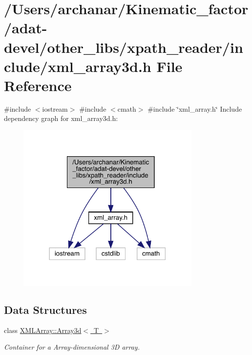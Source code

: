 \hypertarget{adat-devel_2other__libs_2xpath__reader_2include_2xml__array3d_8h}{}\section{/\+Users/archanar/\+Kinematic\+\_\+factor/adat-\/devel/other\+\_\+libs/xpath\+\_\+reader/include/xml\+\_\+array3d.h File Reference}
\label{adat-devel_2other__libs_2xpath__reader_2include_2xml__array3d_8h}
{\ttfamily \#include $<$iostream$>$}\newline
{\ttfamily \#include $<$cmath$>$}\newline
{\ttfamily \#include \char`\"{}xml\+\_\+array.\+h\char`\"{}}\newline
Include dependency graph for xml\+\_\+array3d.\+h\+:
\nopagebreak
\begin{figure}[H]
\begin{center}
\leavevmode
\includegraphics[width=258pt]{d6/ddf/adat-devel_2other__libs_2xpath__reader_2include_2xml__array3d_8h__incl}
\end{center}
\end{figure}
\subsection*{Data Structures}
\begin{DoxyCompactItemize}
\item 
class \mbox{\hyperlink{classXMLArray_1_1Array3d}{X\+M\+L\+Array\+::\+Array3d$<$ T $>$}}
\begin{DoxyCompactList}\small\item\em Container for a Array-\/dimensional 3D array. \end{DoxyCompactList}\end{DoxyCompactItemize}
